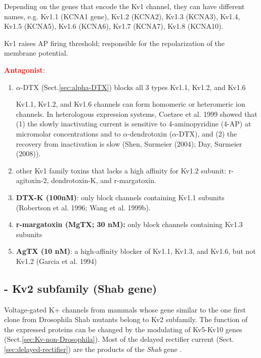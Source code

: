 Depending on the genes that encode the Kv1 channel, they can have different
names, e.g. Kv1.1 (KCNA1 gene), Kv1.2 (KCNA2), Kv1.3 (KCNA3), Kv1.4, Kv1.5
(KCNA5), Kv1.6 (KCNA6), Kv1.7 (KCNA7), Kv1.8 (KCNA10).

Kv1 raises AP firing threshold; responsible for the repolarization of the
membrane potential.

\textcolor{red}{\bf Antagonist}:
\begin{enumerate}
  \item $\alpha$-DTX (Sect.\ref{sec:alpha-DTX}) blocks all 3 types
  Kv1.1, Kv1.2, and Kv1.6
 
Kv1.1, Kv1.2, and Kv1.6 channels can form homomeric or heteromeric ion channels.
In heterologous expression systems, Coetzee et al. 1999 showed that (1) the
slowly inactivating current is sensitive to 4-aminopyridine (4-AP) at micromolar
concentrations and to $\alpha$-dendrotoxin ($\alpha$-DTX), and (2) the recovery
from inactivation is slow (Shen, Surmeier (2004); Day, Surmeier (2008)).

  \item other Kv1 family toxins that lacks a high affinity for Kv1.2 subunit:
  r-agitoxin-2, dendrotoxin-K, and r-margatoxin.

  \item {\bf DTX-K (100nM)}: only block channels containing Kv1.1 subunits
  (Robertson et al. 1996; Wang et al. 1999b).
  
  \item {\bf r-margatoxin (MgTX; 30 nM):} only block channels containing Kv1.3
  subunits
  
  \item {\bf AgTX (10 nM)}: a high-affinity blocker of Kv1.1, Kv1.3, and Kv1.6,
  but not Kv1.2 (Garcia et al. 1994)
\end{enumerate}


\subsection{- Kv2 subfamily (Shab gene)}
\label{sec:Kv2-channels}
\label{sec:Shab-gene}

Voltage-gated K+ channels from mammals whose gene similar to the one first clone
from Drosophila Shab mutants belong to Kv2 subfamily.
The function of the expressed proteins can be changed by the modulating of
Kv5-Kv10 genes (Sect.\ref{sec:Kv-non-Drosophila}). Most of the delayed rectifier
current (Sect.\ref{sec:delayed-rectifier}) are the products of the {\it Shab}
gene \citep{tsunoda1995}.


